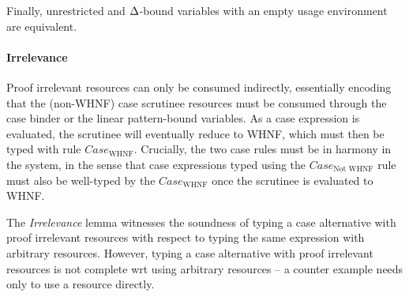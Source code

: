 \documentclass[acmsmall,review,screen]{acmart}
\begin{document}
\DeltaLinearRelationLemma


\noindent Finally, unrestricted and $\Delta$-bound
variables with an empty usage environment are equivalent.

\DeltaUnrestrictedRelationLemma

\paragraph{Irrelevance}
%
Proof irrelevant resources can only be consumed
indirectly, essentially encoding that the (non-WHNF) case scrutinee
resources must be consumed through the case binder or the linear
pattern-bound variables.
%
As a case expression is evaluated, the scrutinee will eventually
reduce to WHNF,
which must then be typed with rule $Case_{\textrm{WHNF}}$.
%
Crucially, the two case rules must be in harmony in the system, in the sense that
case expressions typed using the $Case_{\textrm{Not WHNF}}$ rule must also be
well-typed by the $Case_{\textrm{WHNF}}$ once the scrutinee is evaluated to WHNF.



\WHNFConvSoundness

The \emph{Irrelevance} lemma witnesses the soundness of typing a
case alternative with proof irrelevant resources with respect to
typing the same expression with arbitrary resources. However, typing
a case alternative with proof irrelevant resources is not complete wrt using
arbitrary resources -- a counter example needs only to use a resource
directly.
\end{document}
